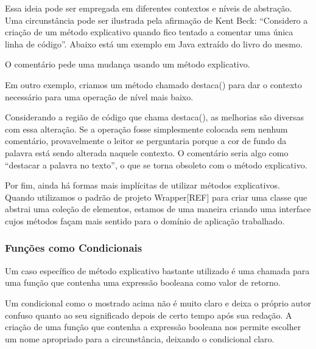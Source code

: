 Essa ideia pode ser empregada em diferentes contextos e níveis de abstração. Uma circunstância pode ser ilustrada pela afirmação de Kent Beck: “Considero a criação de um método explicativo quando fico tentado a comentar uma única linha de código”. Abaixo está um exemplo em Java extraído do livro do mesmo.



O comentário pede uma mudança usando um método explicativo.
	


Em outro exemplo, criamos um método chamado destaca() para dar o contexto necessário para uma operação de nível mais baixo. 



Considerando a região de código que chama destaca(), as melhorias são diversas com essa alteração. Se a operação fosse simplesmente colocada sem nenhum comentário, provavelmente o leitor se perguntaria porque a cor de fundo da palavra está sendo alterada naquele contexto. O comentário seria algo como “destacar a palavra no texto”, o que se torna obsoleto com o método explicativo. 

Por fim, ainda há formas mais implícitas de utilizar métodos explicativos. Quando utilizamos o padrão de projeto Wrapper[REF] para criar uma classe que abstrai uma coleção de elementos, estamos de uma maneira criando uma interface cujos métodos façam mais sentido para o domínio de aplicação trabalhado.

\subsubsection{Funções como Condicionais}
Um caso específico de método explicativo bastante utilizado é uma chamada para uma função que contenha uma expressão booleana como valor de retorno.
	


Um condicional como o mostrado acima não é muito claro e deixa o próprio autor confuso quanto ao seu significado depois de certo tempo após sua redação. A criação de uma função que contenha a expressão booleana nos permite escolher um nome apropriado para a circunstância, deixando o condicional claro.

